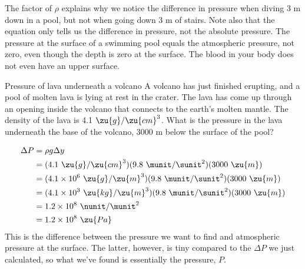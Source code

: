 The factor of $\rho$ explains why we notice the difference in
pressure when diving 3 m down in a pool, but not when going
down 3 m of stairs. Note also that the equation only tells us the
difference in pressure, not the absolute pressure. The
pressure at the surface of a swimming pool equals the
atmospheric pressure, not zero, even though the depth is
zero at the surface. The blood in your body does not even
have an upper surface.

\begin{eg}{Pressure of lava underneath a volcano}
\egquestion
A volcano has just finished erupting, and a pool
of molten lava is lying at rest in the crater. The lava has
come up through an opening inside the volcano that connects
to the earth's molten mantle. The density of the lava is 4.1
$\zu{g}/\zu{cm}^3$. What is the pressure in the lava underneath the base
of the volcano, 3000 m below the surface of the pool?

\eganswer
\begin{align*}
        \Delta P         &=  \rho g\Delta y\\
                        &= ( 4.1\ \zu{g}/\zu{cm}^3)( 9.8\ \munit/\sunit^2)(3000\ \zu{m})\\
                        &= ( 4.1\times10^6\ \zu{g}/\zu{m}^3)
                                        ( 9.8\ \munit/\sunit^2)(3000\ \zu{m})\\
                        &= ( 4.1\times10^3\ \zu{kg}/\zu{m}^3)
                                        ( 9.8\ \munit/\sunit^2)(3000\ \zu{m})\\
                        &= 1.2\times10^8\ \nunit/\munit^2 \\
                        &= 1.2\times10^8\ \zu{Pa}
\end{align*}
This is the difference between the pressure we want to find and
atmospheric pressure at the surface. The latter, however, is tiny compared
to the $\Delta P$ we just calculated, so what we've found is essentially the
pressure, $P$.
\end{eg}

